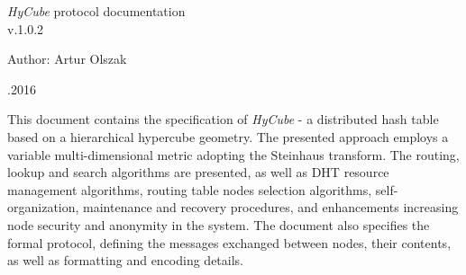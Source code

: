 \documentclass[a4paper,onecolumn,oneside,12pt]{mwrep}
\begin{document}
\begin{titlepage}	%
	
	\fontsize{24pt}{18pt}\selectfont
	\emph{HyCube} protocol documentation \\
	
	\fontsize{16pt}{14pt}\selectfont
	v.1.0.2
	\vspace*{25\baselineskip}
	
	
	\fontsize{14pt}{15pt}\selectfont
	Author: Artur Olszak\\
	\vspace*{1\baselineskip}
	
	
	\begin{flushright}
	\fontsize{10pt}{15pt}.2016
	\end{flushright}
	
\end{titlepage}


\newpage

\newpage
{}


This document contains the specification of \emph{HyCube} - a distributed hash table based on a hierarchical hypercube geometry. The presented approach employs a variable multi-dimensional metric adopting the Steinhaus transform. The routing, lookup and search algorithms are presented, as well as DHT resource management algorithms, routing table nodes selection algorithms, self-organization, maintenance and recovery procedures, and enhancements increasing node security and anonymity in the system. The document also specifies the formal protocol, defining the messages exchanged between nodes, their contents, as well as formatting and encoding details.



\newpage


\setcounter{page}{3}



\tableofcontents


















\nocite{*}





\end{document}
